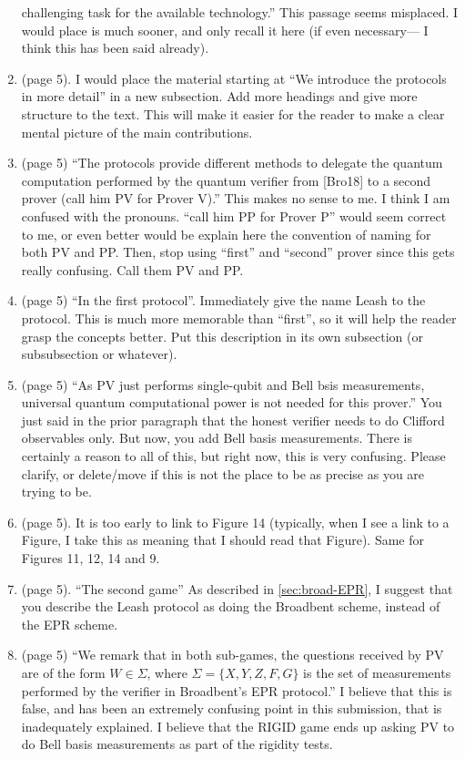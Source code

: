 \documentclass[12pt]{article}
\newcommand{\Leash}{{\sf Leash }}
\newcommand{\Broad}{{\sf Broadbent }}
\newcommand{\EPR}{{\sf EPR }}
\begin{document}
\begin{enumerate}
challenging task for the available technology.'' This passage seems misplaced. I would place is much sooner, and only recall it here (if even necessary--- I think this has been said already).
\item (page 5). I would place the material starting at ``We introduce the protocols in more detail'' in a new subsection. Add more headings and give more structure to the text. This will make it easier for the reader to make a clear mental picture of the main contributions.
\item (page 5) ``The protocols provide different methods to delegate the
quantum computation performed by the quantum verifier from [Bro18] to a second prover (call him PV for
Prover V).'' This makes no sense to me. I think I am confused with the pronouns. ``call him PP for Prover P'' would seem correct to me, or even better would be explain here the convention of naming for both PV and PP. Then, stop using ``first'' and ``second'' prover since this gets really confusing. Call them PV and PP.
\item (page 5) ``In the first protocol''. Immediately give the name \Leash to the protocol. This is much more memorable than ``first'', so it will help the reader grasp the concepts better. Put this description in its own subsection (or subsubsection or whatever).
\item (page 5) ``As PV just performs single-qubit and Bell bsis
measurements, universal quantum computational power is not needed for this prover.'' You just said in the prior paragraph that the honest verifier needs to do Clifford observables only. But now, you add Bell basis measurements. There is certainly a reason to all of this, but right now, this is very confusing. Please clarify, or delete/move if this is not the place to be as precise as you are trying to be.
\item (page 5). It is too early to link to Figure 14 (typically, when I see a link to a Figure, I take this as meaning that I should read that Figure). Same for Figures 11, 12, 14 and 9.
 \item (page 5). ``The second game'' As described in \ref{sec:broad-EPR}, I suggest that you describe the \Leash protocol as doing the \Broad scheme, instead of the \EPR scheme.
\item (page 5) ``We remark that in both sub-games, the questions received by PV are of the form $W \in \Sigma$, where
$\Sigma = \{X,Y, Z, F, G\}$ is the set of measurements performed by the verifier in Broadbent's EPR protocol.'' I believe that this is false, and has been an extremely confusing point in this submission, that is inadequately explained. I believe that the RIGID game ends up asking PV to do Bell basis measurements as part of the rigidity tests.

\end{enumerate}
\end{document}

